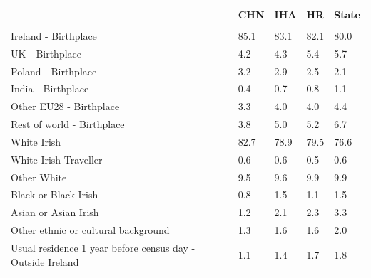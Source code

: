 \documentclass{article}
\begin{document}
\pagebreak
\begin{table}[h]	
\centering
		\begin{tabular}{KTTTT}
  \hline
& \textbf{CHN} & \textbf{IHA} & \textbf{HR}& \textbf{State}\\ 
  \hline
    \\ 
    \hline
Ireland - Birthplace & 85.1& 83.1& 82.1& 80.0\\
UK - Birthplace & 4.2& 4.3& 5.4& 5.7\\
Poland - Birthplace & 3.2& 2.9& 2.5& 2.1\\
India - Birthplace & 0.4& 0.7& 0.8& 1.1\\
Other EU28 - Birthplace & 3.3& 4.0& 4.0& 4.4\\
Rest of world - Birthplace & 3.8& 5.0& 5.2& 6.7\\
    \hline
White Irish & 82.7& 78.9& 79.5& 76.6\\
White Irish Traveller & 0.6& 0.6& 0.5& 0.6\\
Other White & 9.5& 9.6& 9.9& 9.9\\
Black or Black Irish & 0.8& 1.5& 1.1& 1.5\\
Asian or Asian Irish & 1.2& 2.1& 2.3& 3.3\\
Other ethnic or cultural background & 1.3& 1.6& 1.6& 2.0\\
    \hline
Usual residence 1 year before census day - Outside Ireland & 1.1& 1.4& 1.7& 1.8\\


\end{tabular}
\end{table}
\end{document}
